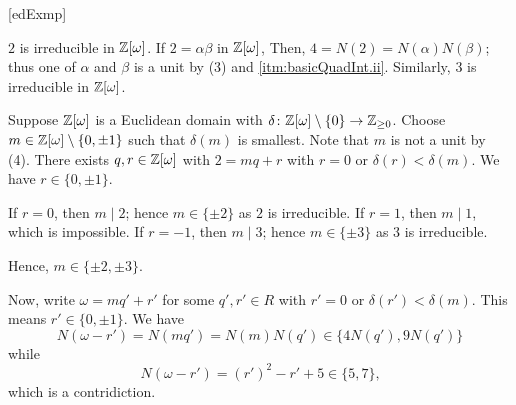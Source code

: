 \documentclass[../modern_algebra_2.tex]{subfiles}
\begin{document}
\begin{Example}{}[edExmp]
\begin{enumerate}[label=(\roman*), ref=\protect{\Cref{exmp:edExmp} (\roman*)}, listparindent=\parindent]
        \(2\) is irreducible in \(\ZZ{}[\omega]\).
        If \(2 = \alpha \beta\) in \(\ZZ{}[\omega]\),
        Then, \(4 = N(2) = N(\alpha)N(\beta)\); thus one of \(\alpha\) and \(\beta\) is a unit
        by (3) and \ref{itm:basicQuadInt.ii}.
        Similarly, \(3\) is irreducible in \(\ZZ{}[\omega]\).

        Suppose \(\ZZ{}[\omega]\) is a Euclidean domain with \(\delta \colon \ZZ{}[\omega] \setminus
        \{0\} \to \ZZ_{\ge 0}\).
        Choose \(m \in \ZZ{}[\omega] \setminus \{0, \pm 1\}\) such that \(\delta(m)\) is smallest.
        Note that \(m\) is not a unit by (4).
        There exists \(q, r \in \ZZ{}[\omega]\) with
        \(2 = mq + r\) with \(r = 0\) or \(\delta(r) < \delta(m)\).
        We have \(r \in \{0, \pm 1\}\).
        \begin{itemize}
            \ii
            If \(r = 0\), then \(m \mid 2\); hence \(m \in \{\pm 2\}\) as \(2\) is irreducible.
            \ii
            If \(r = 1\), then \(m \mid 1\), which is impossible.
            \ii
            If \(r = -1\), then \(m \mid 3\); hence \(m \in \{\pm 3\}\) as \(3\) is irreducible.
        \end{itemize}
        Hence, \(m \in \{\pm 2, \pm 3\}\).

        Now, write \(\omega = mq' + r'\) for some \(q', r' \in R\) with \(r' = 0\) or
        \(\delta(r') < \delta(m)\). This means \(r' \in \{0, \pm 1\}\).
        We have
        \[
            N(\omega - r') = N(mq') = N(m)N(q') \in \{4N(q'), 9N(q')\}
        \]
        while
        \[
            N(\omega - r') = (r')^2 - r' + 5 \in \{5, 7\}\text{,}
        \]
        which is a contridiction.
    \end{enumerate}
\end{Example}
\end{document}

